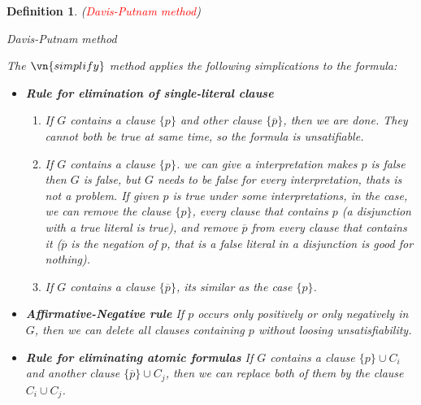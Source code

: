 \documentclass{article}
\theoremstyle{plain}
\newtheorem{definition}[theorem]{Definition}
\newcounter{case}
\theoremstyle{nonumberplain}
\newcommand{\redt}[1]{\textcolor{red}{#1}}
\begin{document}
\begin{definition}
\rm (\redt{Davis-Putnam method}) 
\begin{algorithm}
\caption{Davis-Putnam method}
\DontPrintSemicolon
{}
\end{algorithm}

The $\vn{simplify}$ method applies the following simplications to the formula:
\begin{itemize}
	\item \textbf{Rule for elimination of single-literal clause}
	\begin{enumerate}
		\item If $G$ contains a clause $\{p\}$ and other clause $\{\overline{p}\}$, then we are done. They cannot both be  true at same time, so the formula is unsatifiable.
		\item If $G$ contains a clause $\{p\}$. we can give a interpretation makes $p$ is false then $G$ is false, but $G$ needs to be false for every interpretation, thats is not a problem. If given $p$ is true under some interpretations, in the case, we can remove the clause $\{p\}$, every clause that contains $p$ (a disjunction with a true literal is true),  and remove $\overline{p}$ from every clause that contains it ($\overline{p}$ is the negation of $p$, that is a false literal in a disjunction is good for nothing).  
		\item If $G$ contains a clause $\{\overline{p}\}$, its similar as the case $\{p\}$.
	\end{enumerate}
	\item \textbf{Affirmative-Negative rule}\newline
	If $p$ occurs only positively or only negatively in $G$, then we can delete all clauses containing $p$ without loosing unsatisfiability. 
	\item \textbf{Rule for eliminating atomic formulas}\newline
	If $G$ contains a clause $\{p\} \cup C_i$ and another clause $\{\overline{p}\} \cup C_j$, then we can replace both of them by the clause $C_i \cup C_j$. 
\end{itemize}
\end{definition}
\end{document}
